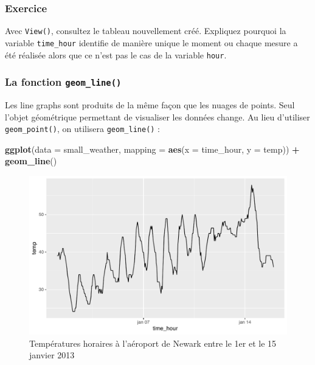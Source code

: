 \documentclass[a4paperpaper,]{article}
\newenvironment{Shaded}{\begin{snugshade}}{\end{snugshade}}
\newcommand{\KeywordTok}[1]{\textcolor[rgb]{0.13,0.29,0.53}{\textbf{#1}}}
\newcommand{\DataTypeTok}[1]{\textcolor[rgb]{0.13,0.29,0.53}{#1}}
\newcommand{\StringTok}[1]{\textcolor[rgb]{0.31,0.60,0.02}{#1}}
\newcommand{\OperatorTok}[1]{\textcolor[rgb]{0.81,0.36,0.00}{\textbf{#1}}}
\newcommand{\NormalTok}[1]{#1}
\theoremstyle{definition}
\theoremstyle{definition}
\theoremstyle{definition}
\theoremstyle{remark}
\begin{document}
\subsubsection{Exercice}\label{exercice}

Avec \texttt{View()}, consultez le tableau nouvellement créé. Expliquez
pourquoi la variable \texttt{time\_hour} identifie de manière unique le
moment ou chaque mesure a été réalisée alors que ce n'est pas le cas de
la variable \texttt{hour}.

\subsubsection{\texorpdfstring{La fonction
\texttt{geom\_line()}}{La fonction geom\_line()}}\label{la-fonction-geom_line}

Les line graphs sont produits de la même façon que les nuages de points.
Seul l'objet géométrique permettant de visualiser les données change. Au
lieu d'utiliser \texttt{geom\_point()}, on utilisera
\texttt{geom\_line()} :

\begin{Shaded}
\begin{Highlighting}[]
\KeywordTok{ggplot}\NormalTok{(}\DataTypeTok{data =}\NormalTok{ small_weather, }\DataTypeTok{mapping =} \KeywordTok{aes}\NormalTok{(}\DataTypeTok{x =}\NormalTok{ time_hour, }\DataTypeTok{y =}\NormalTok{ temp)) }\OperatorTok{+}
\StringTok{  }\KeywordTok{geom_line}\NormalTok{()}
\end{Highlighting}
\end{Shaded}

\begin{figure}[htpb]

{\centering \includegraphics[width=0.9\linewidth]{figure/linegraph-1} 

}

\caption{Températures horaires à l'aéroport de Newark entre le 1er et le 15 janvier 2013}\label{fig:linegraph}
\end{figure}
\end{document}
